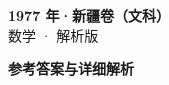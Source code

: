 \documentclass[zihao=-4, a4paper]{ctexart}
\begin{document}
\begin{center}
  {\Large\bfseries 1977 年·新疆卷（文科）}\\[4pt]
  {\large 数学 · 解析版}
\end{center}
\medskip
{}

\clearpage
{}
\begin{center}{\Large\bfseries 参考答案与详细解析}\end{center}
\medskip

\end{document}

